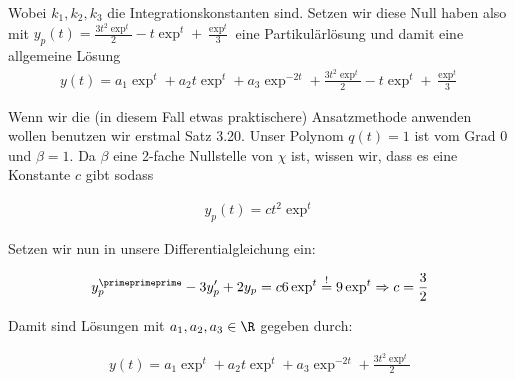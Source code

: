 \begin{solution}
Wobei $k_1,k_2,k_3$ die Integrationskonstanten sind. Setzen wir diese Null haben
also mit $y_p(t) = \frac{3t^2 \exp^t}{2} - t\exp^t + \frac{\exp^t}{3}$ eine
Partikulärlösung und damit eine allgemeine Lösung
\begin{align*}
  y(t) = a_1 \exp^t + a_2 t\exp^t + a_3\exp^{-2t} + \frac{3t^2 \exp^t}{2} - t\exp^t + \frac{\exp^t}{3}
\end{align*}

Wenn wir die (in diesem Fall etwas praktischere) Ansatzmethode anwenden wollen
benutzen wir erstmal Satz 3.20. Unser Polynom $q(t)=1$ ist vom Grad 0 und $\beta=1$.
Da $\beta$ eine 2-fache Nullstelle von $\chi$ ist, wissen wir, dass es eine
Konstante $c$ gibt sodass

\begin{align*}
  y_p (t) = ct^2 \exp^t
\end{align*}

Setzen wir nun in unsere Differentialgleichung ein:

\begin{align*}
  y_p^\primeprimeprime -3y_p^\prime +2y_p =
  c6\exp^t \stackrel{!}{=} 9\exp^t
  \Rightarrow c = \frac{3}{2}
\end{align*}

Damit sind Lösungen mit $a_1 ,a_2 ,a_3 \in \R$ gegeben durch:

\begin{align*}
  y(t) = a_1 \exp^t + a_2 t\exp^t + a_3\exp^{-2t} + \frac{3t^2 \exp^t}{2}
\end{align*}

\end{solution}
